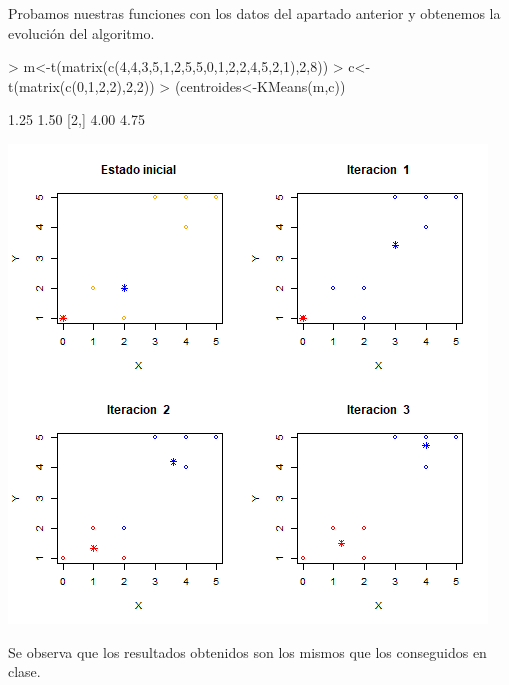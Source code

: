 \documentclass [a4paper] {article}
\begin{document}
\bigskip
Probamos nuestras funciones con los datos del apartado anterior y obtenemos la evolución del algoritmo.
\begin{Schunk}
\begin{Sinput}
> m<-t(matrix(c(4,4,3,5,1,2,5,5,0,1,2,2,4,5,2,1),2,8))
> c<-t(matrix(c(0,1,2,2),2,2))
> (centroides<-KMeans(m,c))
\end{Sinput}
\begin{Soutput}
     [,1] [,2]
[1,] 1.25 1.50
[2,] 4.00 4.75
\end{Soutput}
\end{Schunk}
\includegraphics[width=\textwidth]{resultadoKMeans}

\bigskip
Se observa que los resultados obtenidos son los mismos que los conseguidos en clase.
\end{document}
